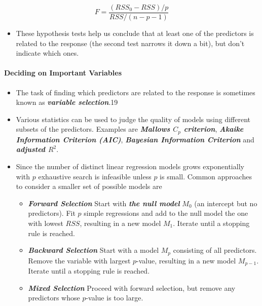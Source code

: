 \documentclass[11pt]{article}
\providecommand{\tightlist}{%
      \setlength{\itemsep}{0pt}\setlength{\parskip}{0pt}}
\begin{document}
\[ F = \frac{(RSS_0 - RSS)/p}{RSS/(n - p - 1)} \]

\begin{itemize}
\tightlist
\item
  These hypothesis tests help us conclude that at least one of the
  predictors is related to the response (the second test narrows it down
  a bit), but don't indicate which ones.
\end{itemize}

    \hypertarget{deciding-on-important-variables}{%
\paragraph{Deciding on Important
Variables}\label{deciding-on-important-variables}}

    \begin{itemize}
\item
  The task of finding which predictors are related to the response is
  sometimes known as \textbf{\emph{variable selection}}.19
\item
  Various statistics can be used to judge the quality of models using
  different subsets of the predictors. Examples are
  \textbf{\emph{Mallows \(C_p\) criterion}}, \textbf{\emph{Akaike
  Information Criterion (AIC)}}, \textbf{\emph{Bayesian Information
  Criterion}} and \textbf{\emph{adjusted \(R^2\)}}.
\item
  Since the number of distinct linear regression models grows
  exponentially with \(p\) exhaustive search is infeasible unless \(p\)
  is small. Common approaches to consider a smaller set of possible
  models are

  \begin{itemize}
  \tightlist
  \item
    \textbf{\emph{Forward Selection}} Start with \textbf{\emph{the null
    model}} \(M_0\) (an intercept but no predictors). Fit \(p\) simple
    regressions and add to the null model the one with lowest \(RSS\),
    resulting in a new model \(M_1\). Iterate until a stopping rule is
    reached.
  \item
    \textbf{\emph{Backward Selection}} Start with a model \(M_p\)
    consisting of all predictors. Remove the variable with largest
    \(p\)-value, resulting in a new model \(M_{p-1}\). Iterate until a
    stopping rule is reached.
  \item
    \textbf{\emph{Mixed Selection}} Proceed with forward selection, but
    remove any predictors whose \(p\)-value is too large.
  \end{itemize}
\end{itemize}
\end{document}
